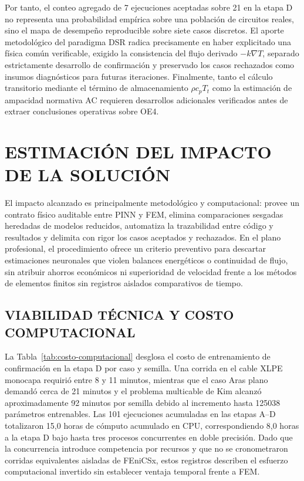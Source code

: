 Por tanto, el conteo agregado de 7 ejecuciones aceptadas sobre 21 en la etapa D no representa una probabilidad empírica sobre una población de circuitos reales, sino el mapa de desempeño reproducible sobre siete casos discretos. El aporte metodológico del paradigma DSR radica precisamente en haber explicitado una física común verificable, exigido la consistencia del flujo derivado $-k\nabla T$, separado estrictamente desarrollo de confirmación y preservado los casos rechazados como insumos diagnósticos para futuras iteraciones. Finalmente, tanto el cálculo transitorio mediante el término de almacenamiento $\rho c_p T_t$ como la estimación de ampacidad normativa AC requieren desarrollos adicionales verificados antes de extraer conclusiones operativas sobre OE4.

\section{ESTIMACIÓN DEL IMPACTO DE LA SOLUCIÓN}
\label{sec:impacto}

El impacto alcanzado es principalmente metodológico y computacional: provee un contrato físico auditable entre PINN y FEM, elimina comparaciones sesgadas heredadas de modelos reducidos, automatiza la trazabilidad entre código y resultados y delimita con rigor los casos aceptados y rechazados. En el plano profesional, el procedimiento ofrece un criterio preventivo para descartar estimaciones neuronales que violen balances energéticos o continuidad de flujo, sin atribuir ahorros económicos ni superioridad de velocidad frente a los métodos de elementos finitos sin registros aislados comparativos de tiempo.

\subsection{VIABILIDAD TÉCNICA Y COSTO COMPUTACIONAL}

La Tabla~\ref{tab:costo-computacional} desglosa el costo de entrenamiento de confirmación en la etapa D por caso y semilla. Una corrida en el cable XLPE monocapa requirió entre 8 y 11 minutos, mientras que el caso Aras plano demandó cerca de 21 minutos y el problema multicable de Kim alcanzó aproximadamente 92 minutos por semilla debido al incremento hasta \num{125038} parámetros entrenables. Las 101 ejecuciones acumuladas en las etapas A--D totalizaron 15,0 horas de cómputo acumulado en CPU, correspondiendo 8,0 horas a la etapa D bajo hasta tres procesos concurrentes en doble precisión. Dado que la concurrencia introduce competencia por recursos y que no se cronometraron corridas equivalentes aisladas de FEniCSx, estos registros describen el esfuerzo computacional invertido sin establecer ventaja temporal frente a FEM.

